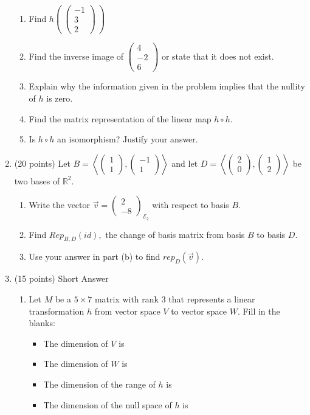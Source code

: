 \documentclass[12pt]{article}
\newcommand{\bpm}{\begin{pmatrix}}
\newcommand{\epm}{\end{pmatrix}}
\begin{document}
\begin{enumerate}
	\begin{enumerate}
	\item Find $h\left( \: \bpm -1 \\ 3 \\ 2 \epm \: \right)$
	\vfill 
	\item Find the inverse image of $\bpm 4\\-2\\6 \epm$ or state that it does not exist.
	\vfill
	\item Explain why the information given in the problem implies that the nullity of $h$ is zero.
	\vfill
	\item Find the matrix representation of the linear map $h \circ h.$
	\vfill
	\item Is $h \circ h$ an isomorphism? Justify your answer.
	\vfill
	\end{enumerate}
\newpage
\item (20 points) Let $B = \left \langle \bpm 1\\ 1 \epm, \bpm -1 \\1 \epm \right \rangle$ and let $D= \left \langle \bpm 2\\ 0 \epm, \bpm 1 \\2 \epm \right \rangle$ be two bases of $\mathbb{R}^2.$
	\begin{enumerate}
	\item Write the vector $\vec{v}=\bpm 2\\-8 \epm_{\mathcal{E}_2}$ with respect to basis $B.$
	\vfill
	\item Find $Rep_{B,D}(id),$ the change of basis matrix from basis $B$ to basis $D$. 
	\vfill
	\item Use your answer in part (b) to find $rep_D(\vec{v}).$
	\vfill
	\end{enumerate}
\newpage 
\item (15 points) Short Answer
	\begin{enumerate}
	\item Let $M$ be a $5 \times 7$ matrix with rank 3 that represents a linear transformation $h$ from vector space $V$ to vector space $W$. Fill in the blanks:\\
	\begin{itemize}
	\item The dimension of $V$ is \underline{\hspace{1in}}
	\item The dimension of $W$ is \underline{\hspace{1in}}
	\item The dimension of the range of $h$ is \underline{\hspace{1in}}
	\item The dimension of the null space of $h$ is \underline{\hspace{1in}}\\
	\end{itemize}
	

\end{enumerate}
\end{enumerate}
\end{document}
